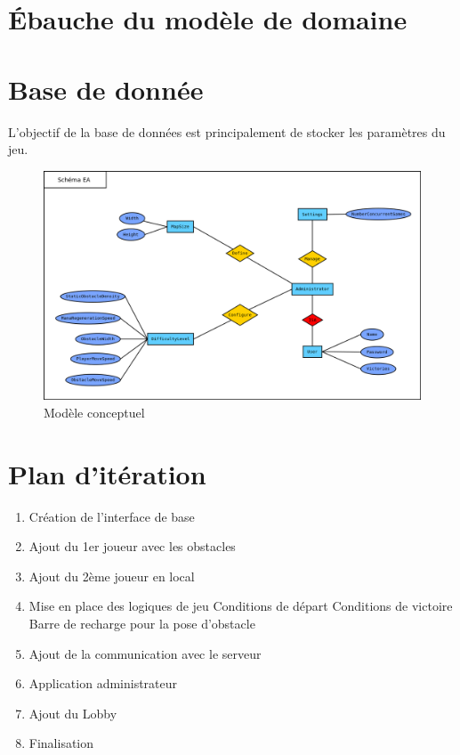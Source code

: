 \documentclass[a4paper,11pt]{article}
\begin{document}
	\section{Ébauche du modèle de domaine}

	\section{Base de donnée}
	L'objectif de la base de données est principalement de stocker les paramètres du jeu.
	\begin{figure}[!ht]
		\centering
		\includegraphics[scale=0.4]{../Database/ER_diagram.png}
		\caption{Modèle conceptuel}
		\label{database_er}
	\end{figure}

	\newpage
	\section{Plan d'itération}
		\begin{enumerate}
			\item Création de l'interface de base
			\item Ajout du 1er joueur avec les obstacles
			\item Ajout du 2ème joueur en local
			\item Mise en place des logiques de jeu
				\subitem Conditions de départ
				\subitem Conditions de victoire
				\subitem Barre de recharge pour la pose d'obstacle
			\item Ajout de la communication avec le serveur
			\item Application administrateur
			\item Ajout du Lobby
			\item Finalisation
		\end{enumerate}
\end{document}

